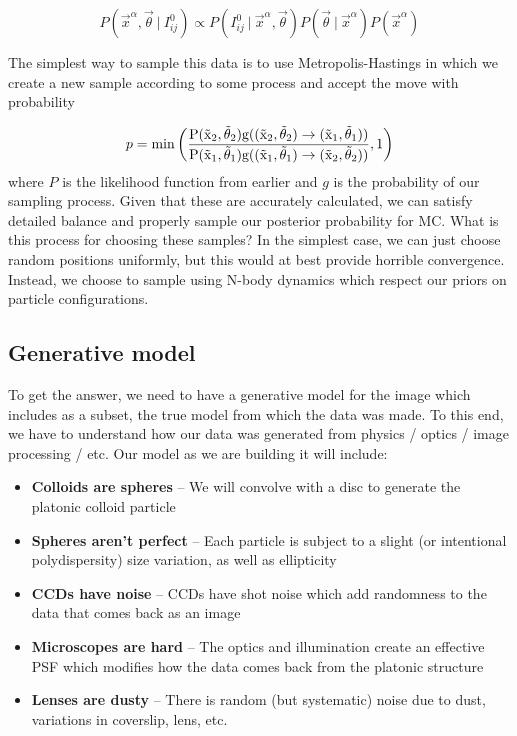 \documentclass[twocolumn,amsmath,amssymb]{revtex4}
\newcommand\given[1][]{\:#1\vert\:}
\begin{document}
\begin{equation}
    P(\vec{x}^\alpha, \vec{\theta} \given I^0_{ij}) \propto P(I^0_{ij} \given \vec{x}^\alpha, \vec{\theta}) P(\vec{\theta} \given \vec{x}^\alpha) P(\vec{x}^\alpha)
\end{equation}

The simplest way to sample this data is to use Metropolis-Hastings in which we
create a new sample according to some process and accept the move with
probability

\begin{equation}
    p = \rm{min}\left(\frac{P(\vec{x}_2, \vec{\theta}_2) g((\vec{x}_2,\vec{\theta}_2) \rightarrow (\vec{x}_1, \vec{\theta}_1))}{P(\vec{x}_1, \vec{\theta}_1) g((\vec{x}_1,\vec{\theta}_1) \rightarrow (\vec{x}_2, \vec{\theta}_2))}, 1\right)
\end{equation}
where $P$ is the likelihood function from earlier and $g$ is the probability of
our sampling process.  Given that these are accurately calculated, we can
satisfy detailed balance and properly sample our posterior probability for MC.
What is this process for choosing these samples?  In the simplest case, we can
just choose random positions uniformly, but this would at best provide horrible
convergence.  Instead, we choose to sample using N-body dynamics which respect
our priors on particle configurations.

\subsection{Generative model}

To get the answer, we need to have a generative model for the image which
includes as a subset, the true model from which the data was made.  To this
end, we have to understand how our data was generated from physics / optics /
image processing / etc.  Our model as we are building it will include:

\begin{itemize}

    \item {\bf Colloids are spheres} -- We will convolve with a disc to
        generate the platonic colloid particle

    \item {\bf Spheres aren't perfect} -- Each particle is subject to a slight
        (or intentional polydispersity) size variation, as well as ellipticity

    \item {\bf CCDs have noise} -- CCDs have shot noise which add randomness to
        the data that comes back as an image

    \item {\bf Microscopes are hard} -- The optics and illumination create an
        effective PSF which modifies how the data comes back from the platonic
        structure

    \item {\bf Lenses are dusty} -- There is random (but systematic) noise due
        to dust, variations in coverslip, lens, etc.

\end{itemize}
\end{document}
